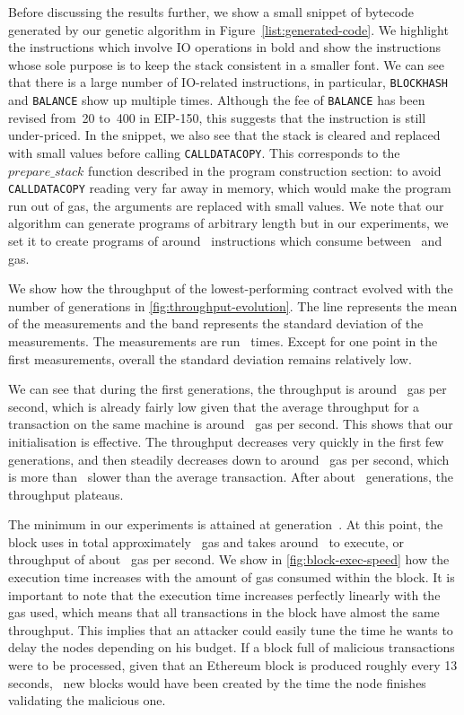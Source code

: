   Before discussing the results further, we show a small snippet of bytecode generated by our genetic algorithm in Figure~\ref{list:generated-code}. We highlight the instructions which involve IO operations in bold and show the instructions whose sole purpose is to keep the stack consistent in a smaller font. We can see that there is a large number of IO-related instructions, in particular, \lstinline{BLOCKHASH} and \lstinline{BALANCE} show up multiple times. Although the fee of \lstinline{BALANCE} has been revised from~20 to~400 in EIP-150, this suggests that the instruction is still under-priced. In the snippet, we also see that the stack is cleared and replaced with small values before calling \lstinline{CALLDATACOPY}. This corresponds to the $prepare\_stack$ function described in the program construction section: to avoid \lstinline{CALLDATACOPY} reading very far away in memory, which would make the program run out of gas, the arguments are replaced with small values. We note that our algorithm can generate programs of arbitrary length but in our experiments, we set it to create programs of around~ instructions which consume between~ and  gas.

  We show how the throughput of the lowest-performing contract evolved with the number of generations in \autoref{fig:throughput-evolution}. The line represents the mean of the measurements and the band represents the standard deviation of the measurements. The measurements are run~ times.
  Except for one point in the first measurements, overall the standard deviation remains relatively low.

  We can see that during the first generations, the throughput is around~ gas per second, which is already fairly low given that the average throughput for a transaction on the same machine is around~ gas per second. This shows that our initialisation is effective. The throughput decreases very quickly in the first few generations, and then steadily decreases down to around~ gas per second, which is more than~ slower than the average transaction. After about~ generations, the throughput plateaus.

  The minimum in our experiments is attained at generation~. At this point, the block uses in total approximately~ gas and takes around~ to execute, or throughput of about~ gas per second. We show in \autoref{fig:block-exec-speed} how the execution time increases with the amount of gas consumed within the block.
  It is important to note that the execution time increases perfectly linearly with the gas used, which means that all transactions in the block have almost the same throughput. This implies that an attacker could easily tune the time he wants to delay the nodes depending on his budget. If a block full of malicious transactions were to be processed, given that an Ethereum block is produced roughly every 13 seconds,~ new blocks would have been created by the time the node finishes validating the malicious one.

